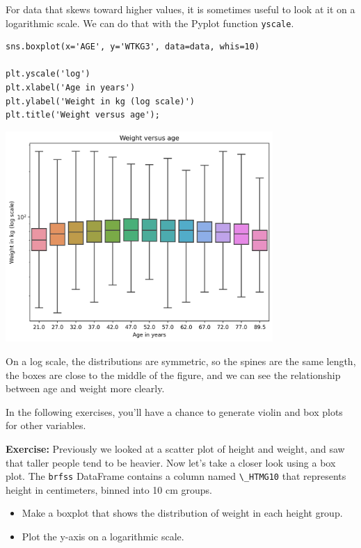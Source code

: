 For data that skews toward higher values, it is sometimes useful to look
at it on a logarithmic scale. We can do that with the Pyplot function
\passthrough{\lstinline!yscale!}.

\begin{lstlisting}[]
sns.boxplot(x='AGE', y='WTKG3', data=data, whis=10)

plt.yscale('log')
plt.xlabel('Age in years')
plt.ylabel('Weight in kg (log scale)')
plt.title('Weight versus age');
\end{lstlisting}

\begin{center}
\includegraphics[width=4in]{chapters/09_relationships_files/09_relationships_46_0.png}
\end{center}

On a log scale, the distributions are symmetric, so the spines are the
same length, the boxes are close to the middle of the figure, and we can
see the relationship between age and weight more clearly.

In the following exercises, you'll have a chance to generate violin and
box plots for other variables.

\textbf{Exercise:} Previously we looked at a scatter plot of height and
weight, and saw that taller people tend to be heavier. Now let's take a
closer look using a box plot. The \passthrough{\lstinline!brfss!}
DataFrame contains a column named \passthrough{\lstinline!\_HTMG10!}
that represents height in centimeters, binned into 10 cm groups.

\begin{itemize}
\item
  Make a boxplot that shows the distribution of weight in each height
  group.
\item
  Plot the y-axis on a logarithmic scale.
\end{itemize}

